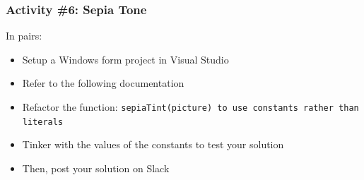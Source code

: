 \begin{frame}
	\frametitle{Activity \#6: Sepia Tone}
	
	In pairs:
	
	\vspace{2em}
	
	\begin{itemize}		
		\item Setup a Windows form project in Visual Studio
		\item Refer to the following documentation
		\item Refactor the function: \texttt{sepiaTint(picture) to use constants rather than literals}
		\item Tinker with the values of the constants to test your solution
		\item Then, post your solution on Slack
	\end{itemize}
\end{frame}


